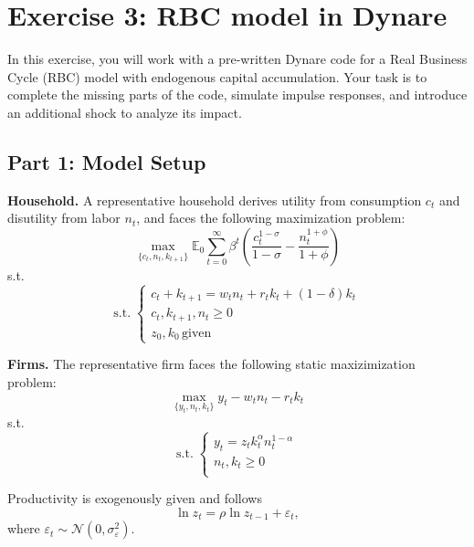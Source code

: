 \documentclass[a4paper,11pt]{article}
\begin{document}

\newpage

\section*{Exercise 3: RBC model in Dynare}

In this exercise, you will work with a pre-written Dynare code for a Real Business Cycle (RBC) model with endogenous capital accumulation. Your task is to complete the missing parts of the code, simulate impulse responses, and introduce an additional shock to analyze its impact. 

\subsection*{Part 1: Model Setup}

\textbf{Household.} A representative household derives utility from consumption \( c_t \) and disutility from labor \( n_t \), and faces the following maximization problem:
\[
   \max_{\{c_t, n_t, k_{t+1}\}} \mathbb{E}_0 \sum_{t=0}^\infty \beta^t \left( \frac{c_t^{1-\sigma}}{1 - \sigma} - \frac{n_t^{1+\phi}}{1 + \phi} \right)
   \]
s.t.
$$ \mathrm{s.t.}\; 
\begin{cases}
c_t + k_{t+1} = w_t n_t + r_t k_t + (1 - \delta) k_t	\\
c_t, k_{t+1}, n_t \geq 0 \\
z_0,k_0\,\text{given}
\end{cases}
$$
  
\textbf{Firms.} The representative firm faces the following static maxizimization problem:
\[
   \max_{\{y_t, n_t, k_t\}} y_t - w_t n_t -  r_t k_t
   \]
s.t.
$$ \mathrm{s.t.}\; 
\begin{cases}
y_t = z_t k_t^{\alpha} n_t^{1 - \alpha} \\
n_t, k_{t} \geq 0 \\
\end{cases}
$$


Productivity is exogenously given and follows
   \[
   \ln z_t = \rho \ln z_{t-1} + \varepsilon_t,
   \]
   where \( \varepsilon_t \sim \mathcal{N}(0, \sigma^2_{\varepsilon}) \).
\end{document}

